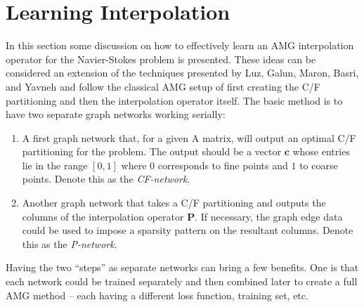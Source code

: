 \documentclass{article}
\newcommand{\mat}[1]{\bm{{#1}}}
\renewcommand{\vec}[1]{\bm{{#1}}}
\begin{document}
\section{Learning Interpolation}
In this section some discussion on how to effectively learn an AMG interpolation operator for the Navier-Stokes problem is presented.  These ideas can be considered an extension of the techniques presented by Luz, Galun, Maron, Basri, and Yavneh \cite{luz2020learning} and follow the classical AMG setup of first creating the C/F partitioning and then the interpolation operator itself.  The basic method is to have two separate graph networks working serially:
\begin{enumerate}
\item A first graph network that, for a given A matrix, will output an optimal C/F partitioning for the problem.  The output should be a vector $\vec{c}$ whose entries lie in the range $\left[0,1\right]$ where $0$ corresponds to fine points and $1$ to coarse points.  Denote this as the \textit{CF-network}.
\item Another graph network that takes a C/F partitioning and outputs the columns of the interpolation operator $\mat{P}$.  If necessary, the graph edge data could be used to impose a sparsity pattern on the resultant columns.  Denote this as the \textit{P-network}.
\end{enumerate}

Having the two ``steps'' as separate networks can bring a few benefits.  One is that each network could be trained separately and then combined later to create a full AMG method -- each having a different loss function, training set, etc.
\end{document}
